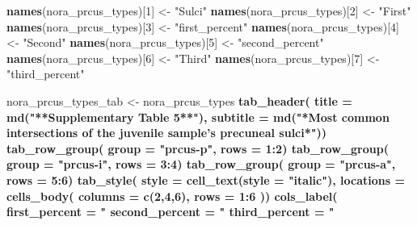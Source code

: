 \documentclass[
]{article}
\newenvironment{Shaded}{\begin{snugshade}}{\end{snugshade}}
\newcommand{\DataTypeTok}[1]{\textcolor[rgb]{0.13,0.29,0.53}{#1}}
\newcommand{\DecValTok}[1]{\textcolor[rgb]{0.00,0.00,0.81}{#1}}
\newcommand{\KeywordTok}[1]{\textcolor[rgb]{0.13,0.29,0.53}{\textbf{#1}}}
\newcommand{\NormalTok}[1]{#1}
\newcommand{\OperatorTok}[1]{\textcolor[rgb]{0.81,0.36,0.00}{\textbf{#1}}}
\newcommand{\StringTok}[1]{\textcolor[rgb]{0.31,0.60,0.02}{#1}}
\begin{document}
\begin{Shaded}
\begin{Highlighting}[]
\KeywordTok{names}\NormalTok{(nora_prcus_types)[}\DecValTok{1}\NormalTok{] <-}\StringTok{ "Sulci"}
\KeywordTok{names}\NormalTok{(nora_prcus_types)[}\DecValTok{2}\NormalTok{] <-}\StringTok{ "First"}
\KeywordTok{names}\NormalTok{(nora_prcus_types)[}\DecValTok{3}\NormalTok{] <-}\StringTok{ "first_percent"}
\KeywordTok{names}\NormalTok{(nora_prcus_types)[}\DecValTok{4}\NormalTok{] <-}\StringTok{ "Second"}
\KeywordTok{names}\NormalTok{(nora_prcus_types)[}\DecValTok{5}\NormalTok{] <-}\StringTok{ "second_percent"}
\KeywordTok{names}\NormalTok{(nora_prcus_types)[}\DecValTok{6}\NormalTok{] <-}\StringTok{ "Third"}
\KeywordTok{names}\NormalTok{(nora_prcus_types)[}\DecValTok{7}\NormalTok{] <-}\StringTok{ "third_percent"}

\NormalTok{nora_prcus_types_tab <-}\StringTok{ }\NormalTok{nora_prcus_types }\OperatorTok{%>%}\StringTok{ }\KeywordTok{gt}\NormalTok{() }\OperatorTok{%>%}
\KeywordTok{tab_header}\NormalTok{(}
  \DataTypeTok{title =} \KeywordTok{md}\NormalTok{(}\StringTok{"**Supplementary Table 5**"}\NormalTok{),}
  \DataTypeTok{subtitle =} \KeywordTok{md}\NormalTok{(}\StringTok{"*Most common intersections of the juvenile sample's precuneal sulci*"}\NormalTok{)) }\OperatorTok{%>%}
\KeywordTok{tab_row_group}\NormalTok{(}
    \DataTypeTok{group =} \StringTok{"prcus-p"}\NormalTok{,}
    \DataTypeTok{rows =} \DecValTok{1}\OperatorTok{:}\DecValTok{2}\NormalTok{) }\OperatorTok{%>%}
\KeywordTok{tab_row_group}\NormalTok{(}
    \DataTypeTok{group =} \StringTok{"prcus-i"}\NormalTok{,}
    \DataTypeTok{rows =} \DecValTok{3}\OperatorTok{:}\DecValTok{4}\NormalTok{) }\OperatorTok{%>%}
\KeywordTok{tab_row_group}\NormalTok{(}
    \DataTypeTok{group =} \StringTok{"prcus-a"}\NormalTok{,}
    \DataTypeTok{rows =} \DecValTok{5}\OperatorTok{:}\DecValTok{6}\NormalTok{) }\OperatorTok{%>%}
\KeywordTok{tab_style}\NormalTok{(}
    \DataTypeTok{style =} \KeywordTok{cell_text}\NormalTok{(}\DataTypeTok{style =} \StringTok{"italic"}\NormalTok{),}
    \DataTypeTok{locations =} \KeywordTok{cells_body}\NormalTok{(}
      \DataTypeTok{columns =} \KeywordTok{c}\NormalTok{(}\DecValTok{2}\NormalTok{,}\DecValTok{4}\NormalTok{,}\DecValTok{6}\NormalTok{),}
      \DataTypeTok{rows =} \DecValTok{1}\OperatorTok{:}\DecValTok{6}
\NormalTok{    )) }\OperatorTok{%>%}
\KeywordTok{cols_label}\NormalTok{(}
    \DataTypeTok{first_percent =} \StringTok{"%"}\NormalTok{,}
    \DataTypeTok{second_percent =} \StringTok{"%"}\NormalTok{,}
    \DataTypeTok{third_percent =} \StringTok{"%"}\NormalTok{) }\OperatorTok{%>%}
}}}}}}}}}
\end{Highlighting}
\end{Shaded}
\end{document}
